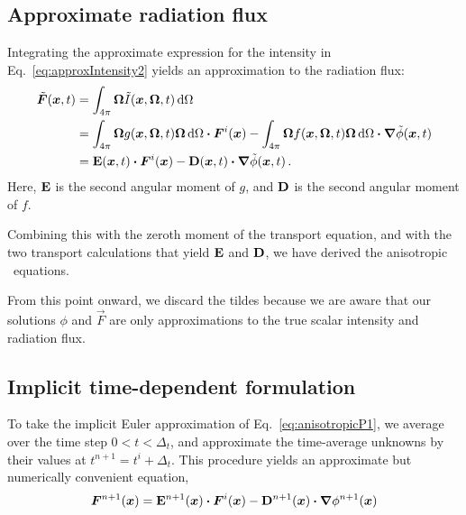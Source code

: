 \subsection{Approximate radiation flux}
Integrating the approximate expression for the intensity in
Eq.~\eqref{eq:approxIntensity2} yields an approximation to the radiation flux:
\begin{align} \nonumber
  \tilde{\bm{F}} (\bm{x}, t)
  &= \int_{4\pi} \bm{\Omega} \tilde I(\bm{x}, \bm{\Omega}, t) \mathop{}\!\mathrm{d}\Omega
  \\ \nonumber
  &= 
  \int_{4\pi} \bm{\Omega} g(\bm{x}, \bm{\Omega}, t) \bm{\Omega} \mathop{}\!\mathrm{d}\Omega
  \bm{\cdot} \bm{F}^i(\bm{x})
  - \int_{4\pi} \bm{\Omega} f(\bm{x}, \bm{\Omega}, t) \bm{\Omega} \mathop{}\!\mathrm{d}\Omega
  \bm{\cdot} \bm{\nabla} \tilde \phi(\bm{x},t)
  \\ \label{eq:anisotropicP1}
  &= \mathbf{E}(\bm{x}, t) \bm{\cdot} \bm{F}^i(\bm{x})
  - \mathbf{D}(\bm{x}, t) \bm{\cdot} \bm{\nabla} \tilde \phi(\bm{x},t) \,.
\end{align}
Here, $\mathbf{E}$ is the second angular moment of $g$, and $\mathbf{D}$ is the second
angular moment of $f$.

Combining this with the zeroth moment of the transport equation, and with the
two transport calculations that yield $\mathbf{E}$ and $\mathbf{D}$, we have
derived the anisotropic \Pone\ equations.

From this point onward, we discard the tildes because we are aware that our
solutions $\phi$ and $\vec{F}$ are only approximations to the true scalar
intensity and radiation flux.

\subsection{Implicit time-dependent formulation}
To take the implicit Euler approximation of Eq.~\eqref{eq:anisotropicP1}, we
average over the time step $0 < t < \Delta_t$, and approximate the
time-average unknowns by their values at $t^{n+1} = t^i + \Delta_t$. This
procedure yields an approximate but numerically convenient equation,
\begin{equation}\label{eq:implicitFlux1}
  \bm{F}^{n+1}(\bm{x}) = \mathbf{E}^{n+1} (\bm{x}) \bm{\cdot} \bm{F}^i(\bm{x})
  - \mathbf{D}^{n+1}(\bm{x}) \bm{\cdot} \bm{\nabla} \phi^{n+1} (\bm{x}) 
\end{equation}

